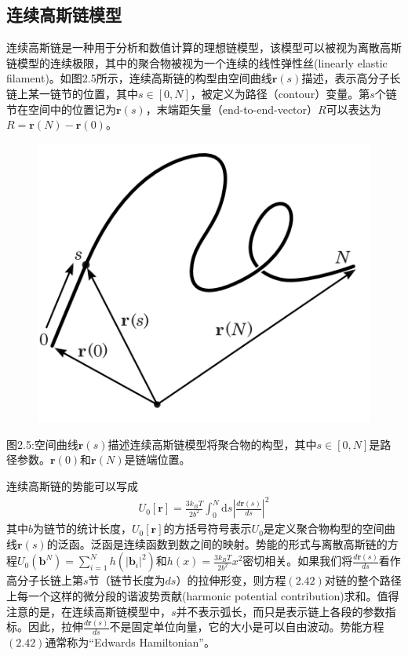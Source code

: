 \subsection{连续高斯链模型}
连续高斯链是一种用于分析和数值计算的理想链模型，该模型可以被视为离散高斯链模型的连续极限，其中的聚合物被视为一个连续的线性弹性丝(linearly elastic filament)。如图2.5所示，连续高斯链的构型由空间曲线$\mathbf{r}(s)$描述，表示高分子长链上某一链节的位置，其中$s\in [0,N]$，被定义为路径（contour）变量。第$s$个链节在空间中的位置记为$\mathbf{r}(s)$，末端距矢量（end-to-end-vector）$R$可以表达为$R=\mathbf{r}(N)−\mathbf{r}(0)$。
\begin{figure}[H]
\centering
\includegraphics[scale=0.7]{./figures/41.png}
\caption{}
\end{figure}
图2.5:空间曲线$\mathbf{r}(s)$描述连续高斯链模型将聚合物的构型，其中$s\in [0,N]$是路径参数。$\mathbf{r}(0)$和$\mathbf{r}(N)$是链端位置。

连续高斯链的势能可以写成
\begin{gather}
U_0[\mathbf{r}]=\frac{3k_BT}{2b^2}\int_{0}^{N} \mathrm{d}s\left| \frac{d\mathbf{r}(s)}{ds} \right|^2
\end{gather}
其中$b$为链节的统计长度，$U_0[\mathbf{r}]$的方括号符号表示$U_0$是定义聚合物构型的空间曲线$\mathbf{r}(s)$的泛函。泛函是连续函数到数之间的映射。势能的形式与离散高斯链的方程$U_0(\mathbf b^N)=\sum_{i=1}^{N}h(\left|\mathbf{b}_i\right|^2 )$和$h(x)=\frac{3k_BT}{2b^2}x^2$密切相关。如果我们将$\frac{d\mathbf{r}(s)}{ds}$看作高分子长链上第$s$节（链节长度为$ds$）的拉伸形变，则方程$(2.42)$对链的整个路径上每一个这样的微分段的谐波势贡献(harmonic potential contribution)求和。值得注意的是，在连续高斯链模型中，$s$并不表示弧长，而只是表示链上各段的参数指标。因此，拉伸$\frac{d\mathbf{r}(s)}{ds}$不是固定单位向量，它的大小是可以自由波动。势能方程$(2.42)$通常称为“Edwards Hamiltonian”。

